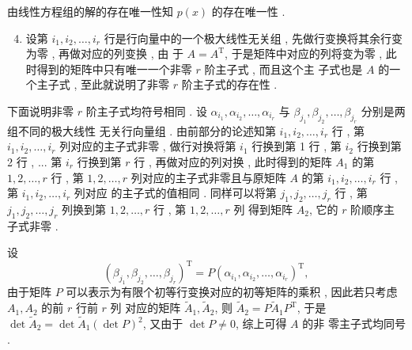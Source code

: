 \documentclass[10pt]{article}
\begin{document}

 由线性方程组的解的存在唯一性知  $p(x)$  的存在唯一性 .

\begin{enumerate}
  \setcounter{enumi}{3}
  \item  设第  $i_{1}, i_{2}, \ldots, i_{r}$  行是行向量中的一个极大线性无关组 ,  先做行变换将其余行变为零 ,  再做对应的列变换 ,  由   于  $A=A^{\mathrm{T}}$,  于是矩阵中对应的列将变为零 ,  此时得到的矩阵中只有唯一一个非零  $r$  阶主子式 ,  而且这个主   子式也是  $A$  的一个主子式 ,  至此就说明了非零  $r$  阶主子式的存在性 .
\end{enumerate}
 下面说明非零  $r$  阶主子式均符号相同 .  设  $\alpha_{i_{1}}, \alpha_{i_{2}}, \ldots, \alpha_{i_{r}}$  与  $\beta_{j_{1}}, \beta_{j_{2}}, \ldots, \beta_{j_{r}}$  分别是两组不同的极大线性   无关行向量组 .  由前部分的论述知第  $i_{1}, i_{2}, \ldots, i_{r}$  行 ,  第  $i_{1}, i_{2}, \ldots, i_{r}$  列对应的主子式非零 ,  做行对换将第  $i_{1}$  行换到第  1  行 ,  第  $i_{2}$  行换到第  2  行 , ...  第  $i_{r}$  行换到第  $r$  行 ,  再做对应的列对换 ,  此时得到的矩阵  $A_{1}$  的第  $1,2, \ldots, r$  行 ,  第  $1,2, \ldots, r$  列对应的主子式非零且与原矩阵  $A$  的第  $i_{1}, i_{2}, \ldots, i_{r}$  行 ,  第  $i_{1}, i_{2}, \ldots, i_{r}$  列对应   的主子式的值相同 .  同样可以将第  $j_{1}, j_{2}, \ldots, j_{r}$  行 ,  第  $j_{1}, j_{2}, \ldots, j_{r}$  列换到第  $1,2, \ldots, r$  行 ,  第  $1,2, \ldots, r$  列   得到矩阵  $A_{2}$,  它的  $r$  阶顺序主子式非零 .

 设 
$$
\left(\beta_{j_{1}}, \beta_{j_{2}}, \ldots, \beta_{j_{r}}\right)^{\mathrm{T}}=P\left(\alpha_{i_{1}}, \alpha_{i_{2}}, \ldots, \alpha_{i_{r}}\right)^{\mathrm{T}},
$$
 由于矩阵  $P$  可以表示为有限个初等行变换对应的初等矩阵的乘积 ,  因此若只考虑  $A_{1}, A_{2}$  的前  $r$  行前  $r$  列   对应的矩阵  $\tilde{A}_{1}, \tilde{A}_{2}$,  则  $\tilde{A}_{2}=P \tilde{A}_{1} P^{\mathrm{T}}$,  于是  $\operatorname{det} \tilde{A}_{2}=\operatorname{det} \tilde{A}_{1}(\operatorname{det} P)^{2}$,  又由于  $\operatorname{det} P \neq 0$,  综上可得  $A$  的非   零主子式均同号 .
\end{document}
